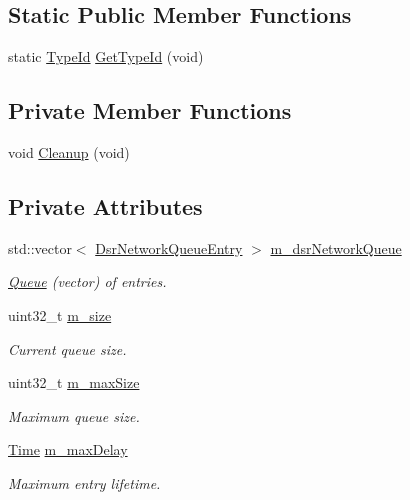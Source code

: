 \subsection*{Static Public Member Functions}
\begin{DoxyCompactItemize}
\item 
static \hyperlink{classns3_1_1TypeId}{Type\+Id} \hyperlink{classns3_1_1dsr_1_1DsrNetworkQueue_a404b2973100f00850f095380ae5e40d4}{Get\+Type\+Id} (void)
\end{DoxyCompactItemize}
\subsection*{Private Member Functions}
\begin{DoxyCompactItemize}
\item 
void \hyperlink{classns3_1_1dsr_1_1DsrNetworkQueue_ae2dae3ec7137252a159a85b5ed91cca6}{Cleanup} (void)
\end{DoxyCompactItemize}
\subsection*{Private Attributes}
\begin{DoxyCompactItemize}
\item 
std\+::vector$<$ \hyperlink{classns3_1_1dsr_1_1DsrNetworkQueueEntry}{Dsr\+Network\+Queue\+Entry} $>$ \hyperlink{classns3_1_1dsr_1_1DsrNetworkQueue_a50e4cbc86ad1bb308085499463eab10c}{m\+\_\+dsr\+Network\+Queue}
\begin{DoxyCompactList}\small\item\em \hyperlink{classns3_1_1Queue}{Queue} (vector) of entries. \end{DoxyCompactList}\item 
uint32\+\_\+t \hyperlink{classns3_1_1dsr_1_1DsrNetworkQueue_aa92eb801ab54d5f15b86d67c77692b55}{m\+\_\+size}
\begin{DoxyCompactList}\small\item\em Current queue size. \end{DoxyCompactList}\item 
uint32\+\_\+t \hyperlink{classns3_1_1dsr_1_1DsrNetworkQueue_a0865236d83a6d50314a5ce3fbcff46ec}{m\+\_\+max\+Size}
\begin{DoxyCompactList}\small\item\em Maximum queue size. \end{DoxyCompactList}\item 
\hyperlink{classns3_1_1Time}{Time} \hyperlink{classns3_1_1dsr_1_1DsrNetworkQueue_a748852e9a67017c0acb680d793f200ea}{m\+\_\+max\+Delay}
\begin{DoxyCompactList}\small\item\em Maximum entry lifetime. \end{DoxyCompactList}\end{DoxyCompactItemize}

